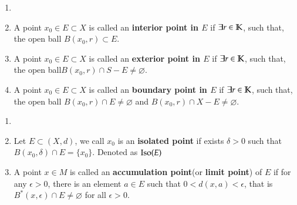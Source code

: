 \begin{definition}\label{def:1.3}
\begin{enumerate}[itemsep=0pt, topsep=0pt]
    \item[]
    \item A point $x_0 \in E \subset X$ is called an \textbf{interior point in $E$} if $\exists r \in \mathbb{K}$, such that, the open ball $B(x_0, r) \subset E$. 
    \item A point $x_0 \in E \subset X$ is called an \textbf{exterior point in $E$} if $\exists r \in \mathbb{K}$, such that, the open ball$B(x_0, r) \cap S - E \neq \varnothing$.
    \item A point $x_0 \in E \subset X$ is called an \textbf{boundary point in $E$} if $\exists r \in \mathbb{K}$, such that, the open ball $B(x_0, r) \cap E \neq \varnothing$ and $B(x_0, r) \cap X - E \neq \varnothing$. 
\end{enumerate}
\end{definition}

\begin{definition}\label{def:1.4}
\begin{enumerate}[itemsep=0pt, topsep=0pt]
    \item[]
    \item Let $E \subset (X, d)$, we call $x_0$ is an \textbf{isolated point} if exists $\delta > 0$ such that $B(x_0, \delta) \cap E = \{x_0\}$. Denoted as $\operatorname{Iso}(E)$
    \item A point $x \in M$ is called an \textbf{accumulation point}(or \textbf{limit point}) of $E$ if for any $\epsilon > 0$, there is an element $a \in E$ such that $0 < d(x, a) < \epsilon$, that is $B^{*}(x, \epsilon) \cap E \neq \varnothing$ for all $\epsilon > 0$. 
\end{enumerate}
\end{definition}

